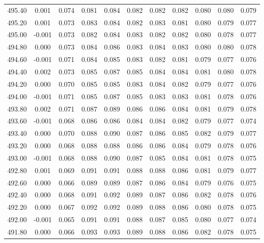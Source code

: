 \begin{longtable}{cccccccccc}
    495.40 &  0.001 &  0.074 &  0.081 &  0.084 &  0.082 &  0.082 &  0.082 &  0.080 &  0.080 &  0.079 \\
    495.20 &  0.001 &  0.073 &  0.083 &  0.084 &  0.082 &  0.083 &  0.081 &  0.080 &  0.079 &  0.077 \\
    495.00 & -0.001 &  0.073 &  0.082 &  0.084 &  0.083 &  0.082 &  0.082 &  0.080 &  0.078 &  0.077 \\
    494.80 &  0.000 &  0.073 &  0.084 &  0.086 &  0.083 &  0.084 &  0.083 &  0.080 &  0.080 &  0.078 \\
    494.60 & -0.001 &  0.071 &  0.084 &  0.085 &  0.083 &  0.082 &  0.081 &  0.079 &  0.077 &  0.076 \\
    494.40 &  0.002 &  0.073 &  0.085 &  0.087 &  0.085 &  0.084 &  0.084 &  0.081 &  0.080 &  0.078 \\
    494.20 &  0.000 &  0.070 &  0.085 &  0.085 &  0.083 &  0.084 &  0.082 &  0.079 &  0.077 &  0.076 \\
    494.00 & -0.001 &  0.071 &  0.085 &  0.087 &  0.085 &  0.083 &  0.083 &  0.081 &  0.078 &  0.076 \\
    493.80 &  0.002 &  0.071 &  0.087 &  0.089 &  0.086 &  0.086 &  0.084 &  0.081 &  0.079 &  0.078 \\
    493.60 & -0.001 &  0.068 &  0.086 &  0.086 &  0.084 &  0.084 &  0.082 &  0.079 &  0.077 &  0.074 \\
    493.40 &  0.000 &  0.070 &  0.088 &  0.090 &  0.087 &  0.086 &  0.085 &  0.082 &  0.079 &  0.077 \\
    493.20 &  0.000 &  0.068 &  0.088 &  0.088 &  0.086 &  0.086 &  0.084 &  0.079 &  0.078 &  0.076 \\
    493.00 & -0.001 &  0.068 &  0.088 &  0.090 &  0.087 &  0.085 &  0.084 &  0.081 &  0.078 &  0.075 \\
    492.80 &  0.001 &  0.069 &  0.091 &  0.091 &  0.088 &  0.088 &  0.086 &  0.081 &  0.079 &  0.077 \\
    492.60 &  0.000 &  0.066 &  0.089 &  0.089 &  0.087 &  0.086 &  0.084 &  0.079 &  0.076 &  0.075 \\
    492.40 &  0.000 &  0.068 &  0.091 &  0.092 &  0.089 &  0.087 &  0.086 &  0.082 &  0.078 &  0.076 \\
    492.20 &  0.000 &  0.067 &  0.092 &  0.092 &  0.089 &  0.088 &  0.086 &  0.080 &  0.078 &  0.075 \\
    492.00 & -0.001 &  0.065 &  0.091 &  0.091 &  0.088 &  0.087 &  0.085 &  0.080 &  0.077 &  0.074 \\
    491.80 &  0.000 &  0.066 &  0.093 &  0.093 &  0.089 &  0.088 &  0.086 &  0.082 &  0.078 &  0.075 \\

\end{longtable}
